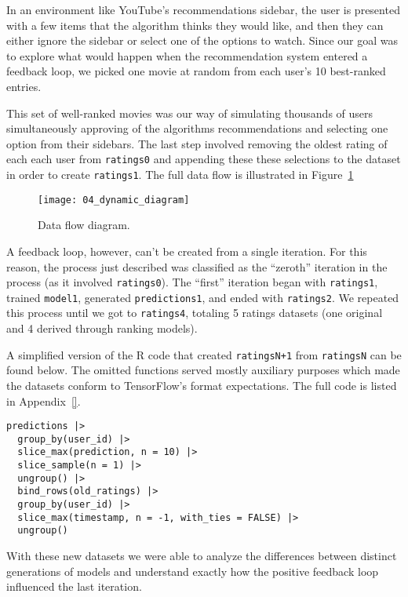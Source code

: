In an environment like YouTube's recommendations sidebar, the user is presented
with a few items that the algorithm thinks they would like, and then they can
either ignore the sidebar or select one of the options to watch. Since our goal
was to explore what would happen when the recommendation system entered a
feedback loop, we picked one movie at random from each user's 10 best-ranked
entries.

This set of well-ranked movies was our way of simulating thousands of users
simultaneously approving of the algorithms recommendations and selecting one
option from their sidebars. The last step involved removing the oldest rating of
each each user from \verb|ratings0| and appending these these selections to the
dataset in order to create \verb|ratings1|. The full data flow is illustrated
in Figure~\ref{fig:fig04_dynamic_diagram}

\begin{figure}
  \centering
  \texttt{[image: 04\_dynamic\_diagram]}
  \caption{Data flow diagram.\label{fig:fig04_dynamic_diagram}}
\end{figure}


A feedback loop, however, can't be created from a single iteration. For this
reason, the process just described was classified as the ``zeroth'' iteration in
the process (as it involved \verb|ratings0|). The ``first'' iteration began with
\verb|ratings1|, trained \verb|model1|, generated \verb|predictions1|, and ended
with \verb|ratings2|. We repeated this process until we got to \verb|ratings4|,
totaling 5 ratings datasets (one original and 4 derived through ranking models).

A simplified version of the R code that created \verb|ratingsN+1| from
\verb|ratingsN| can be found below. The omitted functions served mostly
auxiliary purposes which made the datasets conform to TensorFlow's format
expectations. The full code is listed in Appendix~\ref{}.

\begin{verbatim}
predictions |>
  group_by(user_id) |>
  slice_max(prediction, n = 10) |>
  slice_sample(n = 1) |>
  ungroup() |>
  bind_rows(old_ratings) |>
  group_by(user_id) |>
  slice_max(timestamp, n = -1, with_ties = FALSE) |>
  ungroup()
\end{verbatim}

With these new datasets we were able to analyze the differences between distinct
generations of models and understand exactly how the positive feedback loop
influenced the last iteration.

